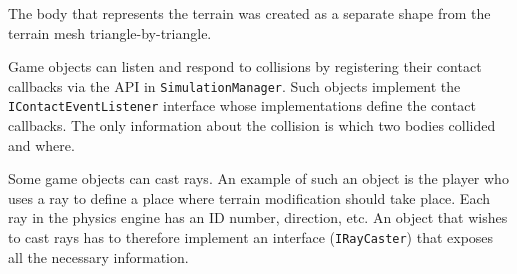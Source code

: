 The body that represents the terrain was created as a separate shape from the terrain mesh triangle-by-triangle.

Game objects can listen and respond to collisions by registering their contact callbacks via the API in \texttt{SimulationManager}.
Such objects implement the \texttt{IContactEventListener} interface whose implementations define the contact callbacks.
The only information about the collision is which two bodies collided and where.

Some game objects can cast rays.
An example of such an object is the player who uses a ray to define a place where terrain modification should take place.
Each ray in the physics engine has an ID number, direction, etc.
An object that wishes to cast rays has to therefore implement an interface (\texttt{IRayCaster}) that exposes all the necessary information.